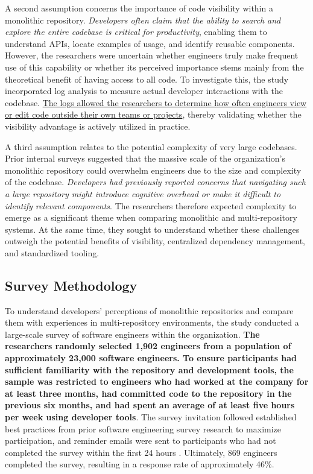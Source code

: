 A second assumption concerns the importance of code visibility within a monolithic repository. \textit{Developers often claim that the ability to search and explore the entire codebase is critical for productivity}, enabling them to understand APIs, locate examples of usage, and identify reusable components. However, the researchers were uncertain whether engineers truly make frequent use of this capability or whether its perceived importance stems mainly from the theoretical benefit of having access to all code. To investigate this, the study incorporated log analysis to measure actual developer interactions with the codebase. \uline{The logs allowed the researchers to determine how often engineers view or edit code outside their own teams or projects}, thereby validating whether the visibility advantage is actively utilized in practice.

A third assumption relates to the potential complexity of very large codebases. Prior internal surveys suggested that the massive scale of the organization's monolithic repository could overwhelm engineers due to the size and complexity of the codebase. \textit{Developers had previously reported concerns that navigating such a large repository might introduce cognitive overhead or make it difficult to identify relevant components}. The researchers therefore expected complexity to emerge as a significant theme when comparing monolithic and multi-repository systems. At the same time, they sought to understand whether these challenges outweigh the potential benefits of visibility, centralized dependency management, and standardized tooling.

\subsection{Survey Methodology}

To understand developers' perceptions of monolithic repositories and compare them with experiences in multi-repository environments, the study conducted a large-scale survey of software engineers within the organization. \textbf{The researchers randomly selected 1,902 engineers from a population of approximately 23,000 software engineers. To ensure participants had sufficient familiarity with the repository and development tools, the sample was restricted to engineers who had worked at the company for at least three months, had committed code to the repository in the previous six months, and had spent an average of at least five hours per week using developer tools}. The survey invitation followed established best practices from prior software engineering survey research to maximize participation, and reminder emails were sent to participants who had not completed the survey within the first 24 hours \cite{smith2013improving}. Ultimately, 869 engineers completed the survey, resulting in a response rate of approximately 46\%.

